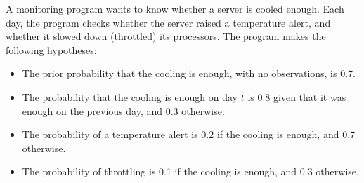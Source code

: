 \documentclass[11pt, a4paper]{exam}
\begin{document}
\begin{exercises}

A monitoring program wants to know whether a server is cooled enough. Each day, the program checks whether the server raised a temperature alert, and whether it slowed down (throttled) its processors. The program makes the following hypotheses:
\begin{itemize}
    \item The prior probability that the cooling is enough, with no observations, is \num{0.7}.
    \item The probability that the cooling is enough on day $t$ is \num{0.8} given that it was enough on the previous day, and \num{0.3} otherwise.
    \item The probability of a temperature alert is \num{0.2} if the cooling is enough, and \num{0.7} otherwise.
    \item The probability of throttling is \num{0.1} if the cooling is enough, and \num{0.3} otherwise.
\end{itemize}

\end{exercises}
\end{document}
